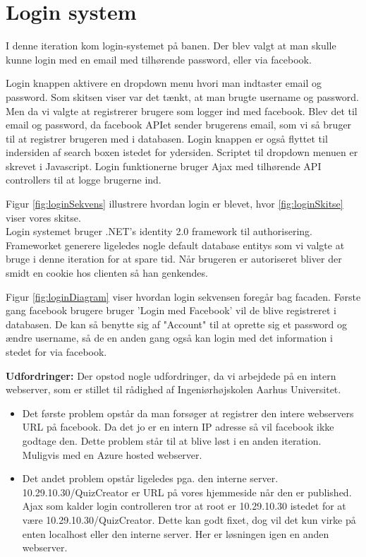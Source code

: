 \section{Login system}

I denne iteration kom login-systemet på banen. Der blev valgt at man skulle kunne login med en email med tilhørende password, eller via facebook.


Login knappen aktivere en dropdown menu hvori man indtaster email og password. Som skitsen viser var det tænkt, at man brugte username og password. Men da vi valgte at registrerer brugere som logger ind med facebook. Blev det til email og password, da facebook APIet sender brugerens email, som vi så bruger til at registrer brugeren med i databasen. Login knappen er også flyttet til indersiden af search boxen istedet for ydersiden. Scriptet til dropdown menuen er skrevet i Javascript. Login funktionerne bruger Ajax med tilhørende API controllers til at logge brugerne ind.

Figur \ref{fig:loginSekvens} illustrere hvordan login er blevet, hvor \ref{fig:loginSkitse} viser vores skitse. \\

Login systemet bruger .NET's identity 2.0 framework til authorisering. Frameworket generere ligeledes nogle default database entitys som vi valgte at bruge i denne iteration for at spare tid. Når brugeren er autoriseret bliver der smidt en cookie hos clienten så han genkendes.



Figur \ref{fig:loginDiagram} viser hvordan login sekvensen foregår bag facaden. Første gang facebook brugere bruger 'Login med Facebook' vil de blive registreret i databasen. De kan så benytte sig af "Account" til at oprette sig et password og ændre username, så de en anden gang også kan login med det information i stedet for via facebook.

\textbf{Udfordringer:} 
Der opstod nogle udfordringer, da vi arbejdede på en intern webserver, som er stillet til rådighed af Ingeniørhøjskolen Aarhus Universitet. 

\begin{itemize}
	\item Det første problem opstår da man forsøger at registrer den intere webservers URL på facebook. Da det jo er en intern IP adresse så vil facebook ikke godtage den. Dette problem står til at blive løst i en anden iteration. Muligvis med en Azure hosted webserver.
	\item Det andet problem opstår ligeledes pga. den interne server. 10.29.10.30/QuizCreator er URL på vores hjemmeside når den er published. Ajax som kalder login controlleren tror at root er 10.29.10.30 istedet for at være 10.29.10.30/QuizCreator. Dette kan godt fixet, dog vil det kun virke på enten localhost eller den interne server. Her er løsningen igen en anden webserver.
\end{itemize}